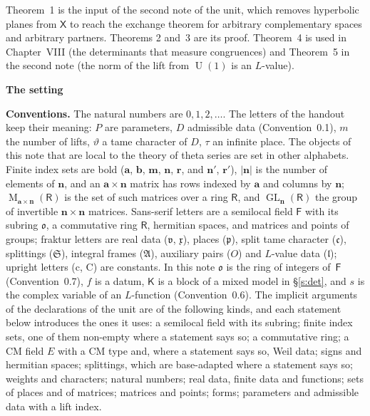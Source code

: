 \documentclass[11pt,a4paper]{article}
\newcommand{\sect}[2]{\refstepcounter{section}\label{#2}\par\addvspace{19pt plus 4pt minus 2pt}\Needspace{7\baselineskip}%
  \noindent\llap{{\fontsize{13.2}{16}\selectfont\bfseries\color{inkfaint}\thesection}\hspace{9pt}}%
  {\fontsize{13.2}{16}\selectfont\bfseries\color{ink}#1}\par\nopagebreak\vspace{-1pt}}
\theoremstyle{plainx}
\theoremstyle{uprightx}
\newenvironment{conventions}{\par\addvspace{5pt}\noindent\textbf{Conventions.}\enspace\ignorespaces}{\par\addvspace{3pt}}
\newcommand{\sF}{\mathsf{F}}
\newcommand{\sO}{\mathfrak{o}}
\newcommand{\sR}{\mathsf{R}}
\newcommand{\ba}{\mathbf{a}}
\newcommand{\bb}{\mathbf{b}}
\newcommand{\bm}{\mathbf{m}}
\newcommand{\bn}{\mathbf{n}}
\newcommand{\br}{\mathbf{r}}
\newcommand{\sX}{\mathsf{X}}
\newcommand{\fc}{\mathfrak{c}}
\newcommand{\fp}{\mathfrak{p}}
\newcommand{\fv}{\mathfrak{v}}
\newcommand{\fx}{\mathfrak{x}}
\newcommand{\fS}{\mathfrak{S}}
\newcommand{\fA}{\mathfrak{A}}
\newcommand{\fa}{O}
\newcommand{\fl}{\mathfrak{l}}
\newcommand{\rc}{\mathrm{c}}
\newcommand{\rC}{\mathrm{C}}
\newcommand{\GL}{\operatorname{GL}}
\newcommand{\U}{\operatorname{U}}
\newcommand{\Mat}[2]{\operatorname{M}_{#1\times#2}}
\begin{document}
Theorem~1 is the input of the second note of the unit, which removes hyperbolic planes from $\sX$ to reach the
exchange theorem for arbitrary complementary spaces and arbitrary partners. Theorems 2 and~3 are its proof.
Theorem~4 is used in Chapter~VIII (the determinants that measure congruences) and Theorem~5 in the second note
(the norm of the lift from $\U(1)$ is an $L$-value).

\sect{The setting}{s:setting}
\begin{conventions}\label{c:conventions}
The natural numbers are $0,1,2,\dots$. The letters of the handout keep their meaning: $P$ are parameters, $D$
admissible data (Convention~0.1), $m$ the number of lifts, $\vartheta$ a tame character of $D$, $\tau$ an infinite place. The
objects of this note that are local to the theory of theta series are set in other alphabets. Finite index sets
are bold ($\ba$, $\bb$, $\bm$, $\bn$, $\br$, and $\bn'$, $\br'$), $|\bn|$ is the number of elements of $\bn$, and an
$\ba\times\bn$ matrix has rows indexed by $\ba$ and columns by $\bn$; $\Mat{\ba}{\bn}(\sR)$ is the set of such
matrices over a ring $\sR$, and $\GL_{\bn}(\sR)$ the group of invertible $\bn\times\bn$ matrices. Sans-serif letters are a semilocal field $\sF$ with its subring $\sO$, a
commutative ring $\sR$, hermitian spaces, and matrices and points of groups; fraktur letters are real data ($\fv$, $\fx$), places ($\fp$), split tame
character ($\fc$), splittings ($\fS$), integral frames ($\fA$), auxiliary pairs ($\fa$) and $L$-value data ($\fl$);
upright letters ($\rc$, $\rC$) are constants. In this note $\sO$ is the ring of integers of~$\sF$
(Convention~0.7), $f$ is a datum, $\mathsf{K}$ is a block of a mixed model in §\ref{s:det}, and $s$ is the complex variable of an
$L$-function (Convention~0.6). The implicit arguments of the declarations of the unit are of the
following kinds, and each statement below introduces the ones it uses: a semilocal field with its subring; finite
index sets, one of them non-empty where a statement says so; a commutative ring; a CM field $E$ with a CM type and,
where a statement says so, Weil data; signs and hermitian spaces; splittings, which are base-adapted where a
statement says so; weights and characters; natural numbers; real data, finite data and functions; sets of places and of matrices;
matrices and points; forms; parameters and admissible data with a lift index.
\end{conventions}
\end{document}
